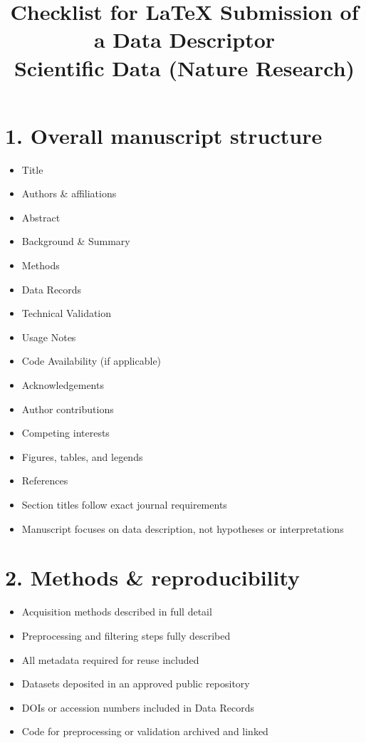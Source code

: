 \documentclass[11pt]{article}
\title{Checklist for LaTeX Submission of a Data Descriptor\\\large Scientific Data (Nature Research)}
\date{}
\begin{document}
\maketitle

\begin{Form}

\section*{1. Overall manuscript structure}

\begin{itemize}[leftmargin=1.5cm]
    \item \CheckBox{} Title
    \item \CheckBox{} Authors \& affiliations
    \item \CheckBox{} Abstract
    \item \CheckBox{} Background \& Summary
    \item \CheckBox{} Methods
    \item \CheckBox{} Data Records
    \item \CheckBox{} Technical Validation
    \item \CheckBox{} Usage Notes
    \item \CheckBox{} Code Availability (if applicable)
    \item \CheckBox{} Acknowledgements
    \item \CheckBox{} Author contributions
    \item \CheckBox{} Competing interests
    \item \CheckBox{} Figures, tables, and legends
    \item \CheckBox{} References
    \item \CheckBox{} Section titles follow exact journal requirements
    \item \CheckBox{} Manuscript focuses on data description, not hypotheses or interpretations
\end{itemize}

\section*{2. Methods \& reproducibility}

\begin{itemize}[leftmargin=1.5cm]
    \item \CheckBox{} Acquisition methods described in full detail
    \item \CheckBox{} Preprocessing and filtering steps fully described
    \item \CheckBox{} All metadata required for reuse included
    \item \CheckBox{} Datasets deposited in an approved public repository
    \item \CheckBox{} DOIs or accession numbers included in Data Records
    \item \CheckBox{} Code for preprocessing or validation archived and linked
\end{itemize}


\end{Form}
\end{document}
